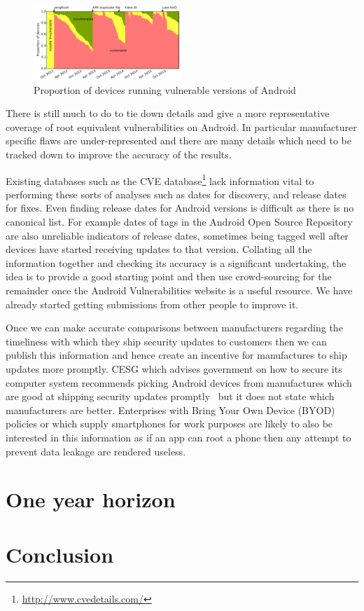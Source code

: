 \documentclass[a4paper,twocolumn]{article}
\begin{document}
\begin{figure}
 \includegraphics[width=0.5\textwidth]{figures/proportioninsecure.pdf}
 \caption{Proportion of devices running vulnerable versions of Android}
 \label{fig:propinsecure}
\end{figure}

There is still much to do to tie down details and give a more representative coverage of root equivalent vulnerabilities on Android.
In particular manufacturer specific flaws are under-represented and there are many details which need to be tracked down to improve the accuracy of the results.

Existing databases such as the CVE database\footnote{\url{http://www.cvedetails.com/}} lack information vital to performing these sorts of analyses such as dates for discovery, and release dates for fixes.
Even finding release dates for Android versions is difficult as there is no canonical list.
For example dates of tags in the Android Open Source Repository are also unreliable indicators of release dates, sometimes being tagged well after devices have started receiving updates to that version.
Collating all the information together and checking its accuracy is a significant undertaking, the idea is to provide a good starting point and then use crowd-sourcing for the remainder once the Android Vulnerabilities website is a useful resource.
We have already started getting submissions from other people to improve it.

Once we can make accurate comparisons between manufacturers regarding the timeliness with which they ship security updates to customers then we can publish this information and hence create an incentive for manufactures to ship updates more promptly.
CESG which advises government on how to secure its computer system recommends picking Android devices from manufactures which are good at shipping security updates promptly~\cite{TODO} but it does not state which manufacturers are better.
Enterprises with Bring Your Own Device (BYOD) policies or which supply smartphones for work purposes are likely to also be interested in this information as if an app can root a phone then any attempt to prevent data leakage are rendered useless.

\section*{One year horizon}

\section*{Conclusion}

\printbibliography
\end{document}
